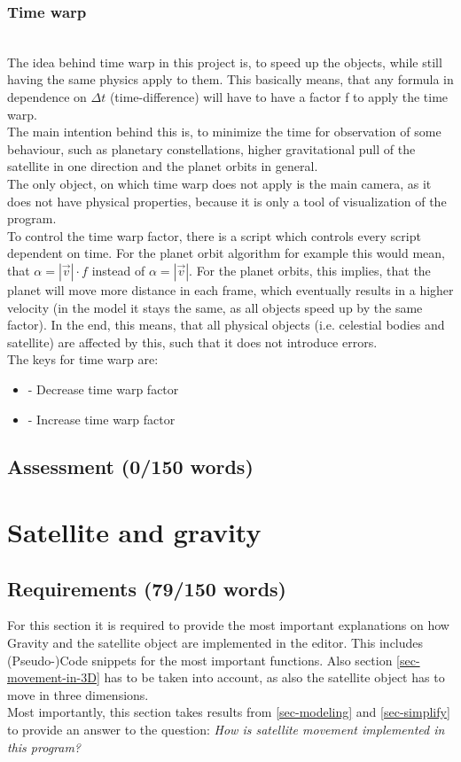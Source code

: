 \documentclass[conference,compsoc]{IEEEtran}
\begin{document}
\subsubsection{Time warp} \hfill\\
The idea behind time warp in this project is, to speed up the objects, while still having the same physics apply to them. This basically means, that any formula in dependence on $\Delta t$ (time-difference) will have to have a factor f to apply the time warp. \\
The main intention behind this is, to minimize the time for observation of some behaviour, such as planetary constellations, higher gravitational pull of the satellite in one direction and the planet orbits in general. \\
The only object, on which time warp does not apply is the main camera, as it does not have physical properties, because it is only a tool of visualization of the program.\\
To control the time warp factor, there is a script which controls every script dependent on time. For the planet orbit algorithm for example this would mean, that $\alpha = |\vec{v}| \cdot f$ instead of $\alpha = |\vec{v}|$. For the planet orbits, this implies, that the planet will move more distance in each frame, which eventually results in a higher velocity (in the model it stays the same, as all objects speed up by the same factor). In the end, this means, that all physical objects (i.e. celestial bodies and satellite) are affected by this, such that it does not introduce errors. \\
The keys for time warp are:
\begin{itemize}
	\item {} - Decrease time warp factor
	\item {} - Increase time warp factor
\end{itemize}
\subsection{Assessment (0/150 words)}
\section{Satellite and gravity}
\label{sec-satellite-gravity}
\subsection{Requirements (79/150 words)}
For this section it is required to provide the most important explanations on how Gravity and the satellite object are implemented in the editor. This includes (Pseudo-)Code snippets for the most important functions. Also section \ref{sec-movement-in-3D} has to be taken into account, as also the satellite object has to move in three dimensions. \\
Most importantly, this section takes results from \ref{sec-modeling} and \ref{sec-simplify} to provide an answer to the question: \emph{How is satellite movement implemented in this program?}
\end{document}
